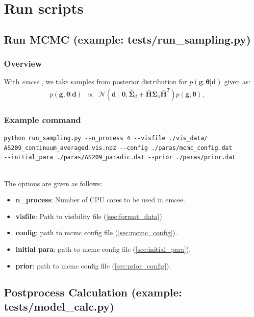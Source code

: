 \documentclass{report}
\begin{document}
\chapter{Run scripts \label{sec:run_script}}
\section{Run MCMC (example: tests/run\_sampling.py)}
\subsection{Overview}

With {\it emcee} \citep{2013PASP..125..306F}, we take samples from posterior distribution for $ p(\bm{g} , \bm{\theta}|\bm{d})$ given as: 
\begin{eqnarray}
   p(\bm{g} , \bm{\theta}|\bm{d}) &\propto&  \mathcal{N}(\bm{d} \mid \bm{0}, \bar{\bm{\Sigma}}_{d} +   \bar{\bm{H}} \bm{\Sigma}_{a} \bar{\bm{H}}^{T}) p(\bm{g} , \bm{\theta}), 
\end{eqnarray}

\subsection{Example command}

\begin{verbatim}
python run_sampling.py --n_process 4 --visfile ./vis_data/
AS209_continuum_averaged.vis.npz --config ./paras/mcmc_config.dat 
--initial_para ./paras/AS209_paradic.dat --prior ./paras/prior.dat 


\end{verbatim}

The options are given as follows: 
    \begin{itemize}
        \item \textbf{n\_process}: Number of CPU cores to be used in emcee.
        \item \textbf{visfile}: Path to visibility file (\ref{sec:format_data})
        \item \textbf{config}: path to mcmc config file (\ref{sec:mcmc_config}). 
        \item \textbf{initial para}: path to mcmc config file (\ref{sec:initial_para}). 
        \item \textbf{prior}: path to mcmc config file (\ref{sec:prior_config}). 
    \end{itemize}



\section{ Postprocess Calculation  (example: tests/model\_calc.py)}
\end{document}
